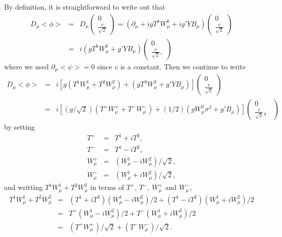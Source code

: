 \documentclass[11pt]{article}
\def\del{{\partial}}
\begin{document}
\section{ }
By definition, it is straightforward to write out that
\begin{eqnarray}
  D_\mu <\phi>
  &=& D_\mu
  \begin{pmatrix}
    0 \\ \frac{v}{\sqrt 2}
  \end{pmatrix}
  =(\del_\mu + i g T^k W^k_\mu + i g' Y B_\mu)
  \begin{pmatrix}
    0 \\ \frac{v}{\sqrt 2}
  \end{pmatrix} \\ 
  &=&i( g T^k W^k_\mu + g' Y B_\mu)
  \begin{pmatrix}
    0 \\ \frac{v}{\sqrt 2},
  \end{pmatrix} 
\end{eqnarray}
where we used $\del_\mu <\psi> =0$ since $v$ is a constant.
Then we continue to write
\begin{eqnarray}
  D_\mu <\phi>
    &=&i[g(T^1W^1_\mu+T^2W^2_\mu) + (gT^3W^3_\mu+g'YB_\mu)]
  \begin{pmatrix}
    0 \\ \frac{v}{\sqrt 2}
  \end{pmatrix} \\
  &=&i[(g/\sqrt2)(T^+W^+_\mu+T^-W^-_\mu)+(1/2)(gW^3_\mu \sigma^3 +g'B_\mu)]
  \begin{pmatrix}
    0 \\ \frac{v}{\sqrt 2}，
  \end{pmatrix}
\end{eqnarray}
by setting
\begin{eqnarray}
  T^+&=&T^1+iT^2, \\
  T^-&=&T^1-iT^2,\\
  W^+_\mu &=& (W^1_\mu - iW^2_\mu)/\sqrt2, \\ 
  W^-_\mu &=& (W^1_\mu + iW^2_\mu)/\sqrt2,
\end{eqnarray}
and writting $T^1 W^1_\mu + T^2 W^2_\mu$ in terms of $T^+$, $T^-$, $W^+_\mu$ and $W^-_\mu$,
\begin{eqnarray}
  T^1 W^1_\mu + T^2 W^2_\mu
  &=& (T^1+iT^2)(W^1_\mu-iW^2_\mu)/2 + (T^1-iT^2)(W^1_\mu+iW^2_\mu)/2 \nonumber \\
  &=& T^+(W^1_\mu-iW^2_\mu)/2 + T^-(W^1_\mu+iW^2_\mu)/2  \nonumber \\
  &=& (T^+ W^+_\mu)/\sqrt2 + (T^- W^-_\mu)/\sqrt2.
\end{eqnarray}
\end{document}
